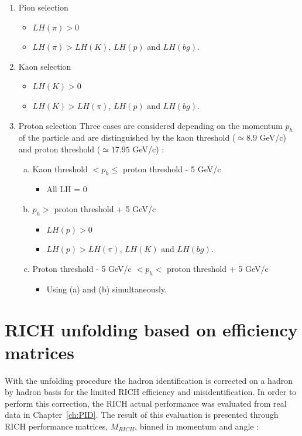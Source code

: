 \begin{enumerate}
  \item Pion selection
  \begin{itemize}
    \item $LH(\pi) > 0$
    \item $LH(\pi) > LH(K)$, $LH(p)$ and $LH(bg)$.
  \end{itemize}
  \item Kaon selection
  \begin{itemize}
    \item $LH(K) > 0$
    \item $LH(K) > LH(\pi)$, $LH(p)$ and $LH(bg)$.
  \end{itemize}
  \item Proton selection
  Three cases are considered depending on the momentum $p_{h}$ of the particle and are distinguished by the kaon threshold ($\simeq 8.9$ GeV/c) and proton threshold ($\simeq 17.95$ GeV/c) :
  \begin{enumerate}[(a)]
    \item Kaon threshold $< p_{h} \leq$ proton threshold - 5 GeV/c
    \begin{itemize}
      \item All LH = $0$
    \end{itemize}
    \item $p_{h} >$ proton threshold + 5 GeV/c
    \begin{itemize}
      \item $LH(p) > 0$
      \item $LH(p) > LH(\pi)$, $LH(K)$ and $LH(bg)$.
    \end{itemize}
    \item Proton threshold - 5 GeV/c $< p_{h} <$ proton threshold + 5 GeV/c
    \begin{itemize}
      \item Using (a) and (b) simultaneously.
    \end{itemize}
  \end{enumerate}
\end{enumerate}


\section{RICH unfolding based on efficiency matrices}

With the unfolding procedure the hadron identification is corrected on a hadron by hadron basis for the limited RICH efficiency and misidentification.
In order to perform this correction, the RICH actual performance was evaluated from real data in Chapter~\ref{ch:PID}. The result of
this evaluation is presented through RICH performance matrices, $M_{RICH}$, binned in momentum
and angle :

